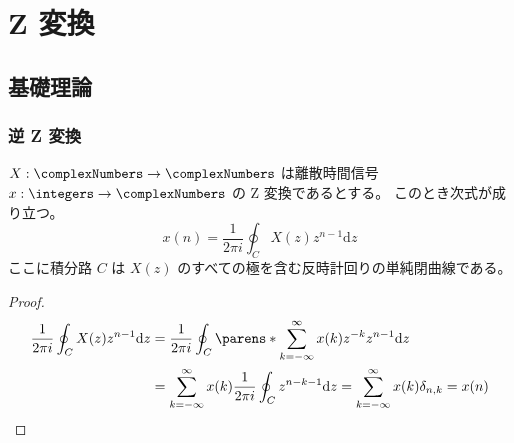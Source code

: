 \part{Z 変換}
	\chapter{基礎理論}
		\section{逆 Z 変換}
			\label{inv_Z_trans}
			\begin{shadebox}
				$X:\complexNumbers\to\complexNumbers$ は離散時間信号 $x:\integers\to\complexNumbers$ の Z 変換であるとする。
				このとき次式が成り立つ。
				\begin{equation}
					\label{eq:inv_Z_trans}
					x(n) = \frac{1}{2\pi i}\oint_C X(z)z^{n-1}\mathrm{d}z
				\end{equation}
				ここに積分路 $C$ は $X(z)$ のすべての極を含む反時計回りの単純閉曲線である。
			\end{shadebox}
			\begin{proof}
				\begin{align*}
					\frac{1}{2\pi i}\oint_C X(z)z^{n-1}\mathrm{d}z &= \frac{1}{2\pi i}\oint_C \parens*{\sum_{k=-\infty}^\infty x(k)z^{-k}}z^{n-1}\mathrm{d}z \\
					&= \sum_{k=-\infty}^\infty x(k)\frac{1}{2\pi i}\oint_C z^{n-k-1}\mathrm{d}z = \sum_{k=-\infty}^\infty x(k)\delta_{n,k} = x(n)
				\end{align*}
			\end{proof}
